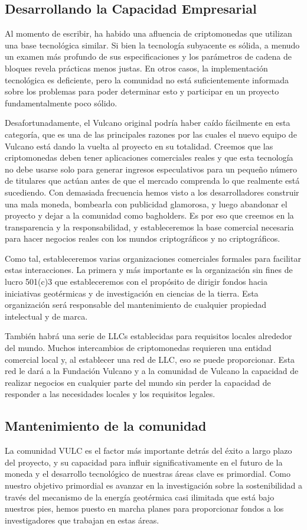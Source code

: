 \documentclass[A4paper, 12pt]{article}
\begin{document}
\subsection{Desarrollando la Capacidad Empresarial}
Al momento de escribir, ha habido una afluencia de criptomonedas que utilizan una base tecnológica similar. Si bien la tecnología subyacente es sólida, a menudo un examen más profundo de sus especificaciones y los parámetros de cadena de bloques revela prácticas menos justas.  En otros casos, la implementación tecnológica es deficiente, pero la comunidad no está suficientemente informada sobre los problemas para poder determinar esto y participar en un proyecto fundamentalmente poco sólido.

Desafortunadamente, el Vulcano original podría haber caído fácilmente en esta categoría, que es una de las principales razones por las cuales el nuevo equipo de Vulcano está dando la vuelta al proyecto en su totalidad. Creemos que las criptomonedas deben tener aplicaciones comerciales reales y que esta tecnología no debe usarse solo para generar ingresos especulativos para un pequeño número de titulares que actúan antes de que el mercado comprenda lo que realmente está sucediendo. Con demasiada frecuencia hemos visto a los desarrolladores construir una mala moneda, bombearla con publicidad glamorosa, y luego abandonar el proyecto y dejar a la comunidad como bagholders. Es por eso que creemos en la transparencia y la responsabilidad, y estableceremos la base comercial necesaria para hacer negocios reales con los mundos criptográficos y no criptográficos.

Como tal, estableceremos varias organizaciones comerciales formales para facilitar estas interacciones.  La primera y más importante es la organización sin fines de lucro 501(c)3 que estableceremos con el propósito de dirigir fondos hacia iniciativas geotérmicas y de investigación en ciencias de la tierra. Esta organización será responsable del mantenimiento de cualquier propiedad intelectual y de marca.

También habrá una serie de LLCs establecidas para requisitos locales alrededor del mundo. Muchos intercambios de criptomonedas requieren una entidad comercial local y, al establecer una red de LLC, eso se puede proporcionar. Esta red le dará a la Fundación Vulcano y a la comunidad de Vulcano la capacidad de realizar negocios en cualquier parte del mundo sin perder la capacidad de responder a las necesidades locales y los requisitos legales.
 
\subsection{Mantenimiento de la comunidad}
La comunidad VULC es el factor más importante detrás del éxito a largo plazo del proyecto, y su capacidad para influir significativamente en el futuro de la moneda y el desarrollo tecnológico de nuestras áreas clave es primordial. Como nuestro objetivo primordial es avanzar en la investigación sobre la sostenibilidad a través del mecanismo de la energía geotérmica casi ilimitada que está bajo nuestros pies, hemos puesto en marcha planes para proporcionar fondos a los investigadores que trabajan en estas áreas.
\end{document}
